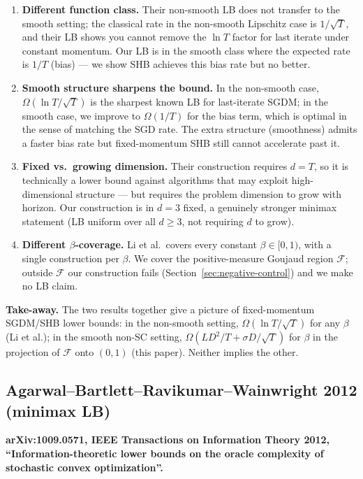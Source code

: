 \documentclass[11pt]{article}
\theoremstyle{definition}
\theoremstyle{remark}
\begin{document}
\begin{enumerate}
\item \textbf{Different function class.} Their non-smooth LB does not transfer to the smooth setting; the classical rate in the non-smooth Lipschitz case is $1/\sqrt T$, and their LB shows you cannot remove the $\ln T$ factor for last iterate under constant momentum. Our LB is in the smooth class where the expected rate is $1/T$ (bias) --- we show SHB achieves this bias rate but no better.

\item \textbf{Smooth structure sharpens the bound.} In the non-smooth case, $\Omega(\ln T / \sqrt T)$ is the sharpest known LB for last-iterate SGDM; in the smooth case, we improve to $\Omega(1/T)$ for the bias term, which is optimal in the sense of matching the SGD rate. The extra structure (smoothness) admits a faster bias rate but fixed-momentum SHB still cannot accelerate past it.

\item \textbf{Fixed vs.\ growing dimension.} Their construction requires $d = T$, so it is technically a lower bound against algorithms that may exploit high-dimensional structure --- but requires the problem dimension to grow with horizon. Our construction is in $d = 3$ fixed, a genuinely stronger minimax statement (LB uniform over all $d \geq 3$, not requiring $d$ to grow).

\item \textbf{Different $\beta$-coverage.} Li et al.\ covers every constant $\beta \in [0,1)$, with a single construction per $\beta$. We cover the positive-measure Goujaud region $\mathcal{F}$; outside $\mathcal{F}$ our construction fails (Section~\ref{sec:negative-control}) and we make no LB claim.
\end{enumerate}

\textbf{Take-away.} The two results together give a picture of fixed-momentum SGDM/SHB lower bounds: in the non-smooth setting, $\Omega(\ln T/\sqrt T)$ for any $\beta$ (Li et al.); in the smooth non-SC setting, $\Omega(LD^2/T + \sigma D/\sqrt T)$ for $\beta$ in the projection of $\mathcal{F}$ onto $(0,1)$ (this paper). Neither implies the other.

\subsection{Agarwal--Bartlett--Ravikumar--Wainwright 2012 (minimax LB)}
\label{sec:agarwal}

\textbf{arXiv:1009.0571, IEEE Transactions on Information Theory 2012, ``Information-theoretic lower bounds on the oracle complexity of stochastic convex optimization''.}
\end{document}
